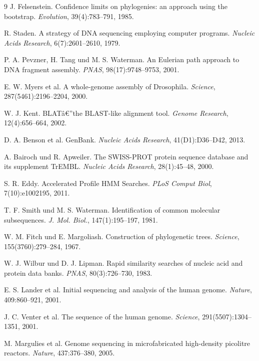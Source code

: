 ﻿\documentclass[a4paper,12pt]{article}
\theoremstyle{definition}
\begin{document}
\begin{thebibliography}{9}
    J. Felsenstein.
    Confidence limits on phylogenies: an approach using the bootstrap.
    \textit{Evolution}, 39(4):783--791, 1985.

    R. Staden.
    A strategy of DNA sequencing employing computer programs.
    \textit{Nucleic Acids Research}, 6(7):2601--2610, 1979.

    P. A. Pevzner, H. Tang und M. S. Waterman.
    An Eulerian path approach to DNA fragment assembly.
    \textit{PNAS}, 98(17):9748--9753, 2001.

    E. W. Myers et al.
    A whole-genome assembly of Drosophila.
    \textit{Science}, 287(5461):2196--2204, 2000.

    W. J. Kent.
    BLATâ€”the BLAST-like alignment tool.
    \textit{Genome Research}, 12(4):656--664, 2002.

    D. A. Benson et al.
    GenBank.
    \textit{Nucleic Acids Research}, 41(D1):D36--D42, 2013.

    A. Bairoch und R. Apweiler.
    The SWISS-PROT protein sequence database and its supplement TrEMBL.
    \textit{Nucleic Acids Research}, 28(1):45--48, 2000.

    S. R. Eddy.
    Accelerated Profile HMM Searches.
    \textit{PLoS Comput Biol}, 7(10):e1002195, 2011.

    T. F. Smith und M. S. Waterman.
    Identification of common molecular subsequences.
    \textit{J. Mol. Biol.}, 147(1):195--197, 1981.

    W. M. Fitch und E. Margoliash.
    Construction of phylogenetic trees.
    \textit{Science}, 155(3760):279--284, 1967.

    W. J. Wilbur und D. J. Lipman.
    Rapid similarity searches of nucleic acid and protein data banks.
    \textit{PNAS}, 80(3):726--730, 1983.

    E. S. Lander et al.
    Initial sequencing and analysis of the human genome.
    \textit{Nature}, 409:860--921, 2001.

    J. C. Venter et al.
    The sequence of the human genome.
    \textit{Science}, 291(5507):1304--1351, 2001.

    M. Margulies et al.
    Genome sequencing in microfabricated high-density picolitre reactors.
    \textit{Nature}, 437:376--380, 2005.


\end{thebibliography}
\end{document}
